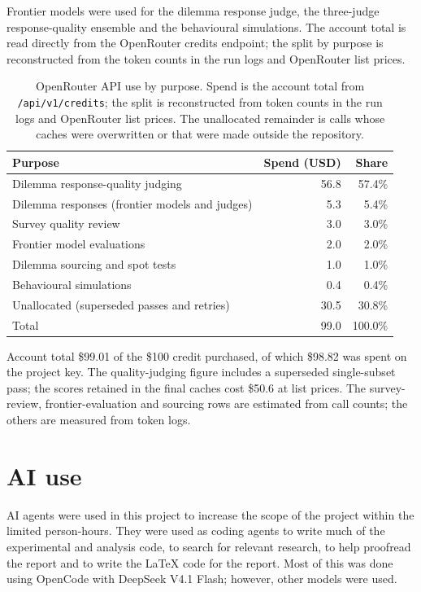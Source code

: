 Frontier models were used for the dilemma response judge, the three-judge
response-quality ensemble and the behavioural simulations. The account total
is read directly from the OpenRouter credits endpoint; the split by purpose is
reconstructed from the token counts in the run logs and OpenRouter list prices.

\begin{table}[t]
	\centering
	\caption{OpenRouter API use by purpose. Spend is the account total from
		\texttt{/api/v1/credits}; the split is reconstructed from token counts
		in the run logs and OpenRouter list prices. The unallocated remainder
		is calls whose caches were overwritten or that were made outside the
		repository.}
	\label{tab:openrouter-use}
	\begin{tabular}{@{}lrr@{}}
		\toprule
		Purpose & Spend (USD) & Share \\
		\midrule
		Dilemma response-quality judging         & 56.8 & 57.4\% \\
		Dilemma responses (frontier models and judges) & 5.3 & 5.4\% \\
		Survey quality review                    & 3.0  & 3.0\%  \\
		Frontier model evaluations               & 2.0  & 2.0\%  \\
		Dilemma sourcing and spot tests          & 1.0  & 1.0\%  \\
		Behavioural simulations                  & 0.4  & 0.4\% \\
		Unallocated (superseded passes and retries) & 30.5 & 30.8\% \\
		\midrule
		Total                                    & 99.0 & 100.0\% \\
		\bottomrule
	\end{tabular}

	\smallskip
	\footnotesize{Account total \$99.01 of the \$100 credit purchased, of which
		\$98.82 was spent on the project key. The quality-judging figure
		includes a superseded single-subset pass; the scores retained in the
		final caches cost \$50.6 at list prices. The survey-review, frontier-evaluation
		and sourcing rows are estimated from call counts; the others are
		measured from token logs.}
\end{table}

\section{AI use}

AI agents were used in this project to increase the scope of the project within the limited person-hours. They were used as coding agents to write much of the experimental and analysis code, to search for relevant research, to help proofread the report and to write the LaTeX code for the report. Most of this was done using OpenCode with DeepSeek V4.1 Flash; however, other models were used.

